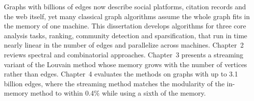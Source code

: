 Graphs with billions of edges now describe social platforms, citation records and the web
itself, yet many classical graph algorithms assume the whole graph fits in the memory of one
machine. This dissertation develops algorithms for three core analysis tasks, ranking,
community detection and sparsification, that run in time nearly linear in the number of edges
and parallelize across machines. Chapter~2 reviews spectral and combinatorial approaches.
Chapter~3 presents a streaming variant of the Louvain method whose memory grows with the
number of vertices rather than edges. Chapter~4 evaluates the methods on graphs with up to 3.1
billion edges, where the streaming method matches the modularity of the in-memory method to
within 0.4\% while using a sixth of the memory.
